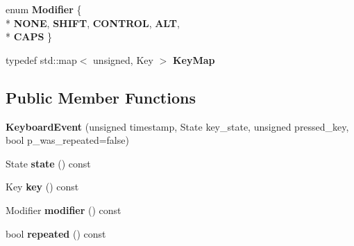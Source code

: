 \begin{DoxyCompactItemize}
\item 
enum {\bfseries Modifier} \{ \\*
{\bfseries N\+O\+NE}, 
{\bfseries S\+H\+I\+FT}, 
{\bfseries C\+O\+N\+T\+R\+OL}, 
{\bfseries A\+LT}, 
\\*
{\bfseries C\+A\+PS}
 \}\hypertarget{classengine_1_1_keyboard_event_a96b87eae3717dc1d8bf302acde1049cb}{}\label{classengine_1_1_keyboard_event_a96b87eae3717dc1d8bf302acde1049cb}

\item 
typedef std\+::map$<$ unsigned, Key $>$ {\bfseries Key\+Map}\hypertarget{classengine_1_1_keyboard_event_afa136a3ea505fcfd3b7108cc3f7f572d}{}\label{classengine_1_1_keyboard_event_afa136a3ea505fcfd3b7108cc3f7f572d}

\end{DoxyCompactItemize}
\subsection*{Public Member Functions}
\begin{DoxyCompactItemize}
\item 
{\bfseries Keyboard\+Event} (unsigned timestamp, State key\+\_\+state, unsigned pressed\+\_\+key, bool p\+\_\+was\+\_\+repeated=false)\hypertarget{classengine_1_1_keyboard_event_a8bd39cffab6759c8f69dc97c1507e665}{}\label{classengine_1_1_keyboard_event_a8bd39cffab6759c8f69dc97c1507e665}

\item 
State {\bfseries state} () const \hypertarget{classengine_1_1_keyboard_event_adc94f8b7cb6434673f83d20cda27b105}{}\label{classengine_1_1_keyboard_event_adc94f8b7cb6434673f83d20cda27b105}

\item 
Key {\bfseries key} () const \hypertarget{classengine_1_1_keyboard_event_a1f6416f842f83dcc165e3aa4015d4da5}{}\label{classengine_1_1_keyboard_event_a1f6416f842f83dcc165e3aa4015d4da5}

\item 
Modifier {\bfseries modifier} () const \hypertarget{classengine_1_1_keyboard_event_aa9ce70b5b6abbb13665ed408c4e1e626}{}\label{classengine_1_1_keyboard_event_aa9ce70b5b6abbb13665ed408c4e1e626}

\item 
bool {\bfseries repeated} () const \hypertarget{classengine_1_1_keyboard_event_a4a9123104496071d5d1c1664bc0a7036}{}\label{classengine_1_1_keyboard_event_a4a9123104496071d5d1c1664bc0a7036}

\end{DoxyCompactItemize}
